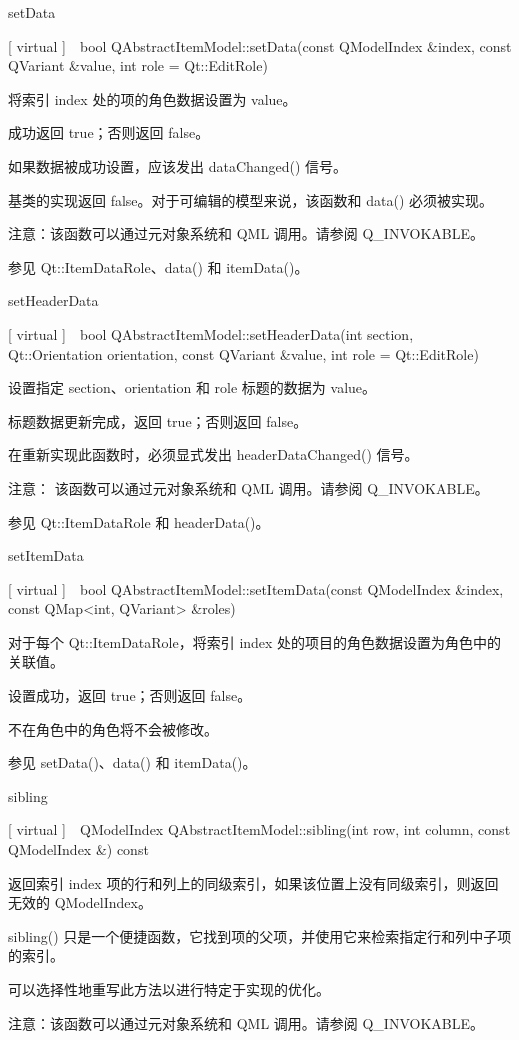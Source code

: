 setData

[ virtual ] bool QAbstractItemModel::setData(const QModelIndex \&index, const QVariant \&value, int role = Qt::EditRole)

将索引 index 处的项的角色数据设置为 value。

成功返回 true；否则返回 false。

如果数据被成功设置，应该发出 dataChanged() 信号。

基类的实现返回 false。对于可编辑的模型来说，该函数和 data() 必须被实现。

注意：该函数可以通过元对象系统和 QML 调用。请参阅 Q\_INVOKABLE。

参见 Qt::ItemDataRole、data() 和 itemData()。

setHeaderData

[ virtual ] bool QAbstractItemModel::setHeaderData(int section, Qt::Orientation orientation, const QVariant \&value, int role = Qt::EditRole)

设置指定 section、orientation 和 role 标题的数据为 value。

标题数据更新完成，返回 true；否则返回 false。

在重新实现此函数时，必须显式发出 headerDataChanged() 信号。

注意： 该函数可以通过元对象系统和 QML 调用。请参阅 Q\_INVOKABLE。

参见 Qt::ItemDataRole 和 headerData()。

setItemData

[ virtual ] bool QAbstractItemModel::setItemData(const QModelIndex \&index, const QMap<int, QVariant> \&roles)

对于每个 Qt::ItemDataRole，将索引 index 处的项目的角色数据设置为角色中的关联值。

设置成功，返回 true；否则返回 false。

不在角色中的角色将不会被修改。

参见 setData()、data() 和 itemData()。

sibling

[ virtual ] QModelIndex QAbstractItemModel::sibling(int row, int column, const QModelIndex \&) const

返回索引 index 项的行和列上的同级索引，如果该位置上没有同级索引，则返回无效的 QModelIndex。

sibling() 只是一个便捷函数，它找到项的父项，并使用它来检索指定行和列中子项的索引。

可以选择性地重写此方法以进行特定于实现的优化。

注意：该函数可以通过元对象系统和 QML 调用。请参阅 Q\_INVOKABLE。

